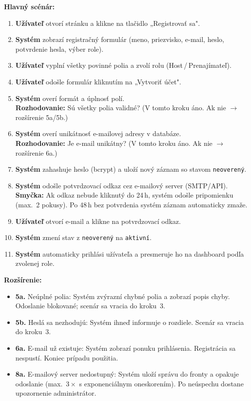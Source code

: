 \documentclass[11pt, a4paper]{article}
\begin{document}
{\textbf{Hlavný scénár:}
\begin{enumerate}
  \item \textbf{Užívateľ} otvorí stránku a klikne na tlačidlo „Registrovať sa".
  \item \textbf{Systém} zobrazí registračný formulár (meno, priezvisko, e-mail, heslo, potvrdenie hesla, výber role).
  \item \textbf{Užívateľ} vyplní všetky povinné polia a zvolí rolu (Host\,/\,Prenajímateľ).
  \item \textbf{Užívateľ} odošle formulár kliknutím na „Vytvoriť účet".
  \item \textbf{Systém} overí formát a úplnosť polí.\\
        \textbf{Rozhodovanie:} Sú všetky polia validné? (V tomto kroku áno. Ak nie $\rightarrow$ rozšírenie 5a/5b.)
  \item \textbf{Systém} overí unikátnosť e-mailovej adresy v databáze.\\
        \textbf{Rozhodovanie:} Je e-mail unikátny? (V tomto kroku áno. Ak nie $\rightarrow$ rozšírenie 6a.)
  \item \textbf{Systém} zahashuje heslo (bcrypt) a uloží nový záznam so stavom \texttt{neoverený}.
  \item \textbf{Systém} odošle potvrdzovací odkaz cez e-mailový server (SMTP/API).\\
        \textbf{Smyčka:} Ak odkaz nebude kliknutý do 24\,h, systém odošle pripomienku (max.\ 2 pokusy). Po 48\,h bez potvrdenia systém záznam automaticky zmaže.
  \item \textbf{Užívateľ} otvorí e-mail a klikne na potvrdzovací odkaz.
  \item \textbf{Systém} zmení stav z \texttt{neoverený} na \texttt{aktivní}.
  \item \textbf{Systém} automaticky prihlási užívateľa a presmeruje ho na dashboard podľa zvolenej role.
\end{enumerate}

\textbf{Rozšírenie:}
\begin{itemize}
  \item \textbf{5a.} Neúplné polia: Systém zvýrazní chybné polia a zobrazí popis chyby. Odoslanie blokované; scenár sa vracia do kroku~3.
  \item \textbf{5b.} Heslá sa nezhodujú: Systém ihneď informuje o rozdiele. Scenár sa vracia do kroku~3.
  \item \textbf{6a.} E-mail už existuje: Systém zobrazí ponuku prihlásenia. Registrácia sa nespustí. Koniec prípadu použitia.
  \item \textbf{8a.} E-mailový server nedostupný: Systém uloží správu do fronty a opakuje odoslanie (max.\ $3\times$ s exponenciálnym oneskorením). Po neúspechu dostane upozornenie administrátor.
\end{itemize}
}%
\end{document}
